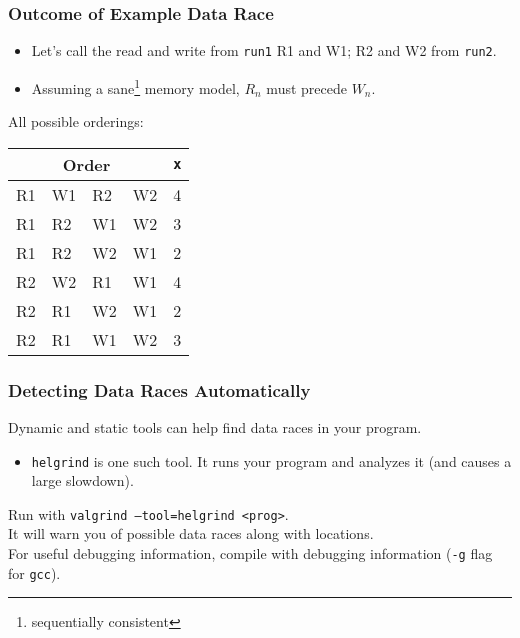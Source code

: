 \documentclass[aspectratio=43]{beamer}
\newenvironment{changemargin}[1]{%
  \begin{list}{}{%
    \setlength{\topsep}{0pt}%
    \setlength{\leftmargin}{#1}%
    \setlength{\rightmargin}{1em}
    \setlength{\listparindent}{\parindent}%
    \setlength{\itemindent}{\parindent}%
    \setlength{\parsep}{\parskip}%
  }%
  \item[]}{\end{list}}
\begin{document}
\begin{frame}
  \frametitle{Outcome of Example Data Race}

  \begin{changemargin}{2cm}
  \begin{itemize}
    \item Let's call the read and write from {\tt run1} R1 and W1; R2 and W2
      from {\tt run2}.
    \item Assuming a sane\footnote{sequentially consistent} memory model, $R_n$ must precede $W_n$.
  \end{itemize}
  \vfill
  All possible orderings:
  \begin{center}
    \begin{tabular}{llll|l}
\multicolumn{4}{c|}{Order} & {\tt *x}\\
\hline
R1 & W1 & R2 & W2 & 4 \\
R1 & R2 & W1 & W2 & 3 \\
R1 & R2 & W2 & W1 & 2 \\
R2 & W2 & R1 & W1 & 4 \\
R2 & R1 & W2 & W1 & 2 \\
R2 & R1 & W1 & W2 & 3 \\
    \end{tabular}
  \end{center}
  \end{changemargin}

\end{frame}

\begin{frame}
  \frametitle{Detecting Data Races Automatically}  

  \begin{changemargin}{2.5cm}
    Dynamic and static tools can help find data races in your program.
  \begin{itemize}
    \item {\tt helgrind} is one such tool. It runs your program 
      and analyzes it (and causes a large slowdown).
  \end{itemize}
    Run with {\tt valgrind --tool=helgrind <prog>}.\\[1em]
    It will warn you of possible data races along with locations.\\[1em]
    For useful debugging information, compile with debugging information
      ({\tt -g} flag for {\tt gcc}).
  \end{changemargin}
\end{frame}
\end{document}
